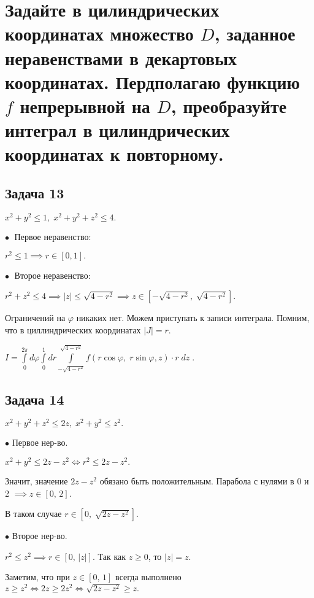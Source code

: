 \documentclass[a4paper, fleqn]{article}
\begin{document}
    \section*{Задайте в цилиндрических координатах множество $D$, заданное неравенствами в декартовых
    координатах. Пердполагаю функцию $f$ непрерывной на $D$, преобразуйте интеграл в цилиндрических
    координатах к повторному.}
    
    \subsection*{Задача 13}
    
    $x^2 + y^2 \leq 1, \; x^2 + y^2 + z^2 \leq 4.$
    
    $\bullet \; $ Первое неравенство:
    
    $r^2 \leq 1 \implies r \in [0,1].$
    
    $\bullet \; $ Второе неравенство:
    
    $r^2 + z^2 \leq 4 \implies |z| \leq \sqrt{4 - r^2} \implies z \in [-\sqrt{4 - r^2}, \; \sqrt{4 - r^2}].$
    
    Ограничений на  $\varphi$ никаких нет. Можем приступать к записи интеграла. Помним, что в циллиндрических координатах $|J| = r.$
    
    $I = \boxed{\displaystyle \int\limits_{0}^{2 \pi} d \varphi \int\limits_{0}^{1} dr \int\limits_{-\sqrt{4 - r^2}}^{\sqrt{4 - r^2}} f(r \cos \varphi, \; r \sin \varphi, z) \cdot r \; dz} \; .$
    
     
    \subsection*{Задача 14}
    
    $x^2 + y^2 + z^2 \leq  2z, \; x^2 + y^2 \leq z^2.$
    
    $\bullet$ Первое нер-во.
    
    $x^2 + y^2 \leq 2z - z^2 \iff r^2 \leq 2z-z^2.$ 
    
    Значит, значение $2z - z^2$ обязано быть положительным. Парабола с нулями в 0 и 2 $\implies z \in [0, \, 2].$
    
    В таком случае $r \in \left[0, \; \sqrt{2z - z^2} \right].$
    
    $\bullet$ Второе нер-во.
    
    $r^2 \leq z^2 \implies r \in \left[0, \, |z|\right].$ Так как $z \geq 0$, то $|z| = z.$ 
    
    Заметим, что при $z \in [0, \, 1]$ всегда выполнено $z \geq z^2 \iff 2z \geq 2z^2 \iff \sqrt{2z - z^2} \geq z .$
    
\end{document}
